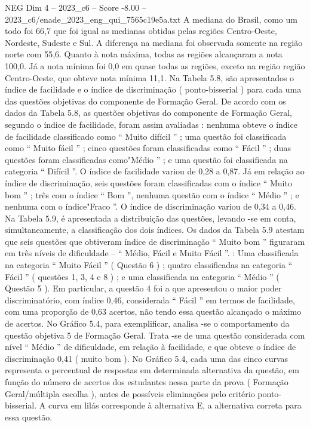 \begin{textsample}{NEG Dim 4 – 2023\_c6 – Score -8.00 – 2023\_c6/enade\_2023\_eng\_qui\_7565c19e5a.txt}
A mediana do Brasil, como um todo foi 66,7 que foi igual as medianas obtidas pelas regiões Centro-Oeste, Nordeste, Sudeste e Sul.
A diferença na mediana foi observada somente na região norte com 55,6.
Quanto à nota máxima, todas as regiões alcançaram a nota 100,0.
Já a nota mínima foi 0,0 em quase todas as regiões, exceto na região região Centro-Oeste, que obteve nota mínima 11,1.
Na Tabela 5.8, são apresentados o índice de facilidade e o índice de discriminação ( ponto-bisserial ) para cada uma das questões objetivas do componente de Formação Geral.
De acordo com os dados da Tabela 5.8, as questões objetivas do componente de Formação Geral, segundo o índice de facilidade, foram assim avaliadas : nenhuma obteve o índice de facilidade classificado como “ Muito difícil ” ; uma questão foi classificada como “ Muito fácil ” ; cinco questões foram classificadas como “ Fácil ” ; duas questões foram classificadas como"Médio ” ; e uma questão foi classificada na categoria “ Difícil ”.
O índice de facilidade variou de 0,28 a 0,87.
Já em relação ao índice de discriminação, seis questões foram classificadas com o índice “ Muito bom ” ; três com o índice “ Bom ”, nenhuma questão com o índice “ Médio ” ; e nenhuma com o índice"Fraco ”.
O índice de discriminação variou de 0,34 a 0,46.
Na Tabela 5.9, é apresentada a distribuição das questões, levando -se em conta, simultaneamente, a classificação dos dois índices.
Os dados da Tabela 5.9 atestam que seis questões que obtiveram índice de discriminação “ Muito bom ” figuraram em três níveis de dificuldade – “ Médio, Fácil e Muito Fácil ”. : Uma classificada na categoria “ Muito Fácil ” ( Questão 6 ) ; quatro classificadas na categoria “ Fácil ” ( questões 1, 3, 4 e 8 ) ; e uma classificada na categoria “ Médio ” ( Questão 5 ).
Em particular, a questão 4 foi a que apresentou o maior poder discriminatório, com índice 0,46, considerada “ Fácil ” em termos de facilidade, com uma proporção de 0,63 acertos, não tendo essa questão alcançado o máximo de acertos.
No Gráfico 5.4, para exemplificar, analisa -se o comportamento da questão objetiva 5 de Formação Geral.
Trata -se de uma questão considerada com nível “ Médio ” de dificuldade, em relação à facilidade, e que obteve o índice de discriminação 0,41 ( muito bom ).
No Gráfico 5.4, cada uma das cinco curvas representa o percentual de respostas em determinada alternativa da questão, em função do número de acertos dos estudantes nessa parte da prova ( Formação Geral/múltipla escolha ), antes de possíveis eliminações pelo critério ponto-bisserial.
A curva em lilás corresponde à alternativa E, a alternativa correta para essa questão.

\end{textsample}
